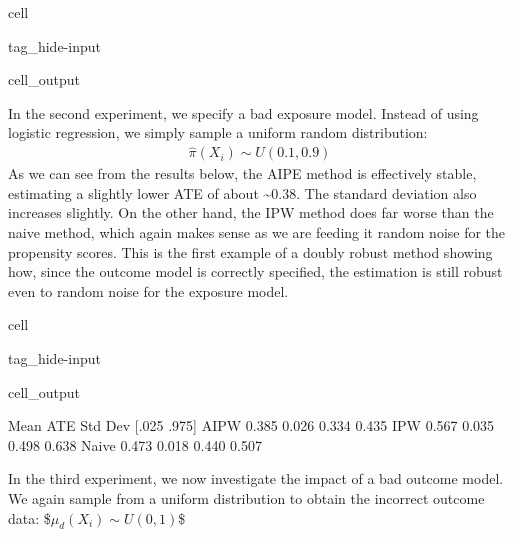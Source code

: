 \documentclass[letterpaper,10pt,english]{jupyterBook}
\begin{document}
\begin{sphinxuseclass}{cell}
\begin{sphinxuseclass}{tag_hide-input}\begin{sphinxVerbatimOutput}

\begin{sphinxuseclass}{cell_output}
\noindent{}

\end{sphinxuseclass}\end{sphinxVerbatimOutput}

\end{sphinxuseclass}
\end{sphinxuseclass}
\sphinxAtStartPar
In the second experiment, we specify a bad exposure model. Instead of using logistic regression, we simply sample a uniform random distribution:
\begin{equation*}
\begin{split} \hat \pi (X_i) \sim U(0.1,0.9) \end{split}
\end{equation*}
\sphinxAtStartPar
As we can see from the results below, the AIPE method is effectively stable, estimating a slightly lower ATE of about \textasciitilde{}\(0.38\). The standard deviation also increases slightly. On the other hand, the IPW method does far worse than the naive method, which again makes sense as we are feeding it random noise for the propensity scores. This is the first example of a doubly robust method showing how, since the outcome model is correctly specified, the estimation is still robust even to random noise for the exposure model.

\begin{sphinxuseclass}{cell}
\begin{sphinxuseclass}{tag_hide-input}\begin{sphinxVerbatimOutput}

\begin{sphinxuseclass}{cell_output}
\begin{sphinxVerbatim}[commandchars=\\\{\}]
       Mean ATE  Std Dev  [.025  .975]
AIPW      0.385    0.026  0.334  0.435
IPW       0.567    0.035  0.498  0.638
Naive     0.473    0.018  0.440  0.507
\end{sphinxVerbatim}

\noindent{}

\end{sphinxuseclass}\end{sphinxVerbatimOutput}

\end{sphinxuseclass}
\end{sphinxuseclass}
\sphinxAtStartPar
In the third experiment, we now investigate the impact of a bad outcome model. We again sample from a uniform distribution to obtain the incorrect outcome data: \$\(\mu_d(X_i) \sim U(0,1) \)\$
\end{document}
